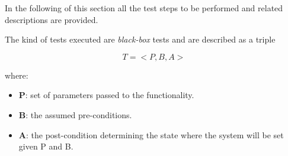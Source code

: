In the following of this section all the test steps to be performed and related descriptions are provided.

The kind of tests executed are \textit{black-box} tests and are described as a triple 

\begin{displaymath}
	T = <P, B, A>
\end{displaymath}

where:

\begin{itemize}
	\item \textbf{P}: set of parameters passed to the functionality.
	\item \textbf{B}: the assumed pre-conditions.
	\item \textbf{A}: the post-condition determining the state where the system will be set given P and B.
\end{itemize}
